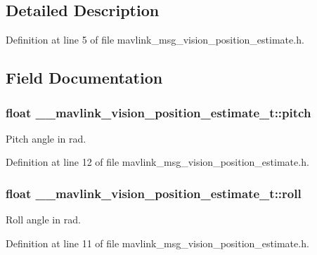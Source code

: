 \subsection{Detailed Description}


Definition at line 5 of file mavlink\-\_\-msg\-\_\-vision\-\_\-position\-\_\-estimate.\-h.



\subsection{Field Documentation}
\hypertarget{struct____mavlink__vision__position__estimate__t_aa07b146c1834dbd8f68a3ad45d07e657}{
\subsubsection[{pitch}]{\setlength{\rightskip}{0pt plus 5cm}float \-\_\-\-\_\-mavlink\-\_\-vision\-\_\-position\-\_\-estimate\-\_\-t\-::pitch}}\label{struct____mavlink__vision__position__estimate__t_aa07b146c1834dbd8f68a3ad45d07e657}


Pitch angle in rad. 



Definition at line 12 of file mavlink\-\_\-msg\-\_\-vision\-\_\-position\-\_\-estimate.\-h.

\hypertarget{struct____mavlink__vision__position__estimate__t_a3075916b20f9f0b12013a6cebbf74827}{
\subsubsection[{roll}]{\setlength{\rightskip}{0pt plus 5cm}float \-\_\-\-\_\-mavlink\-\_\-vision\-\_\-position\-\_\-estimate\-\_\-t\-::roll}}\label{struct____mavlink__vision__position__estimate__t_a3075916b20f9f0b12013a6cebbf74827}


Roll angle in rad. 



Definition at line 11 of file mavlink\-\_\-msg\-\_\-vision\-\_\-position\-\_\-estimate.\-h.

